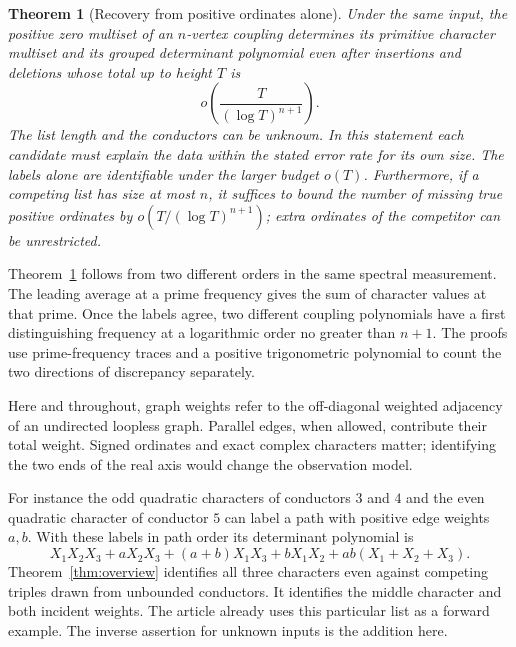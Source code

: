 \documentclass[11pt]{article}
\newtheorem{theorem}{Theorem}[section]
\theoremstyle{remark}\newtheorem{remark}[theorem]{Remark}
\begin{document}
\begin{theorem}[Recovery from positive ordinates alone]\label{thm:onehalf}
Under the same input, the positive zero multiset of an $n$-vertex coupling determines its primitive character multiset and its grouped determinant polynomial even after insertions and deletions whose total up to height $T$ is
\[
 o\!\left(\frac{T}{(\log T)^{n+1}}\right).
\]
The list length and the conductors can be unknown. In this statement each candidate must explain the data within the stated error rate for its own size. The labels alone are identifiable under the larger budget $o(T)$. Furthermore, if a competing list has size at most $n$, it suffices to bound the number of missing true positive ordinates by $o(T/(\log T)^{n+1})$; extra ordinates of the competitor can be unrestricted.
\end{theorem}
Theorem~\ref{thm:onehalf} follows from two different orders in the same spectral measurement. The leading average at a prime frequency gives the sum of character values at that prime. Once the labels agree, two different coupling polynomials have a first distinguishing frequency at a logarithmic order no greater than $n+1$. The proofs use prime-frequency traces and a positive trigonometric polynomial to count the two directions of discrepancy separately.

Here and throughout, graph weights refer to the off-diagonal weighted adjacency of an undirected loopless graph. Parallel edges, when allowed, contribute their total weight. Signed ordinates and exact complex characters matter; identifying the two ends of the real axis would change the observation model.

For instance the odd quadratic characters of conductors $3$ and $4$ and the even quadratic character of conductor $5$ can label a path with positive edge weights $a,b$. With these labels in path order its determinant polynomial is
\[
 X_1X_2X_3+aX_2X_3+(a+b)X_1X_3+bX_1X_2+ab(X_1+X_2+X_3).
\]
Theorem~\ref{thm:overview} identifies all three characters even against competing triples drawn from unbounded conductors. It identifies the middle character and both incident weights. The article already uses this particular list as a forward example. The inverse assertion for unknown inputs is the addition here.
\end{document}
